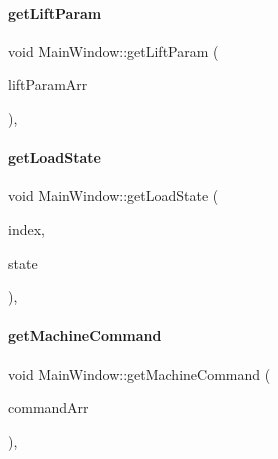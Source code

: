 \mbox{\label{classMainWindow_a65683f9a3748cd4f783daf2f57b4f318}} 
\paragraph{\texorpdfstring{get\+Lift\+Param}{getLiftParam}}
{\footnotesize\ttfamily void Main\+Window\+::get\+Lift\+Param (\begin{DoxyParamCaption}\item[{Q\+Byte\+Array}]{lift\+Param\+Arr }\end{DoxyParamCaption})\hspace{0.3cm}{\ttfamily [private]}, {\ttfamily [slot]}}

\mbox{\label{classMainWindow_a7c2d999fc817728b31dccaaa1e72bd43}} 
\paragraph{\texorpdfstring{get\+Load\+State}{getLoadState}}
{\footnotesize\ttfamily void Main\+Window\+::get\+Load\+State (\begin{DoxyParamCaption}\item[{int}]{index,  }\item[{\mbox{\hyperlink{headform_8h_a56d194976643934b3332b3f99d82490d}{Load\+State}}}]{state }\end{DoxyParamCaption})\hspace{0.3cm}{\ttfamily [private]}, {\ttfamily [slot]}}

\mbox{\label{classMainWindow_a3dfd3ec74dbf6a8bbef327aab4c88de4}} 
\paragraph{\texorpdfstring{get\+Machine\+Command}{getMachineCommand}}
{\footnotesize\ttfamily void Main\+Window\+::get\+Machine\+Command (\begin{DoxyParamCaption}\item[{Q\+Byte\+Array}]{command\+Arr }\end{DoxyParamCaption})\hspace{0.3cm}{\ttfamily [private]}, {\ttfamily [slot]}}

